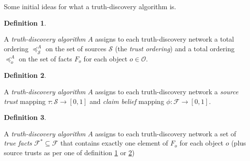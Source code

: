 \documentclass{article}
\theoremstyle{definition}
\newtheorem{definition}{Definition}
\theoremstyle{plain}
\begin{document}
Some initial ideas for what a truth-discovery algorithm is.

\begin{definition}
\label{def:ordinal}

A \emph{truth-discovery algorithm} $A$ assigns to each truth-discovery network
a total ordering $\preceq_\mathcal{S}^A$ on the set of sources $\mathcal{S}$
(the \emph{trust ordering}) and a total ordering $\preceq_o^A$ on the set of
facts $F_o$ for each object $o \in \mathcal{O}$.

\end{definition}

\begin{definition}
\label{def:numerical}

A \emph{truth-discovery algorithm} $A$ assigns to each truth-discovery network
a \emph{source trust} mapping $\tau: \mathcal{S} \rightarrow [0, 1]$ and
\emph{claim belief} mapping $\phi: \mathcal{F} \rightarrow [0, 1]$.

\end{definition}

\begin{definition}
\label{def:most_believed}

A \emph{truth-discovery algorithm} $A$ assigns to each truth-discovery network
a set of \emph{true facts} $\mathcal{F}^* \subseteq \mathcal{F}$ that contains
exactly one element of $F_o$ for each object $o$ (plus source trusts as per one
of definition \ref{def:ordinal} or \ref{def:numerical})

\end{definition}
\end{document}
